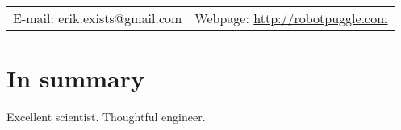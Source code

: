 \documentclass[margin,line]{res}
\begin{document}
\newcommand{\link}[1]{\texttt{#1}}
\providecommand{\tightlist}{%
    \setlength{\itemsep}{0pt}\setlength{\parskip}{0pt}}



\begin{resume}
\section{\sc }
\vspace{.05in}

\begin{tabular}{@{}p{2in}p{4in}}
{E-mail:}  erik.exists@gmail.com   & {Webpage:} \href{http://robotpuggle.com}{http://robotpuggle.com} \\
\end{tabular}

\vspace{-.2cm}
\section{\sc In summary}
Excellent scientist. Thoughtful engineer.







\end{resume}
\end{document}
